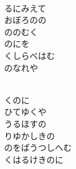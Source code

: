 \documentclass[10pt,b5j]{tarticle} %
\begin{document}
\begin{enumerate}
\begin{minipage}[c]{\blocksize}
        \vspace{\linespace}
        \item~\\
        るにみえて\\
        おぼろのの\\
        ののむく\\
        のにを\\
        くしらべはむ\\
        のなれや
        
    \end{minipage}
    \begin{minipage}[c]{\blocksize}
        
        \vspace{\linespace}
        \item~\\
        くのに\\
        ひてゆくや\\
        うるほすの\\
        りゆかしきの\\
        のをばうつしへむ\\
        くはるけきのに
    
    \end{minipage}
\end{enumerate} %
\end{document}

